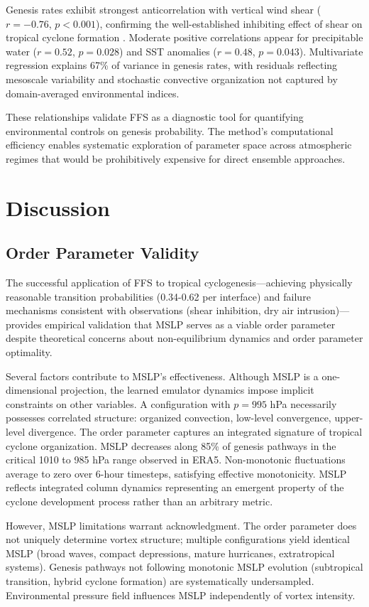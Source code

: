\documentclass[11pt]{article}
\begin{document}
Genesis rates exhibit strongest anticorrelation with vertical wind shear ($r = -0.76$, $p < 0.001$), confirming the well-established inhibiting effect of shear on tropical cyclone formation \citep{gray1968global}. Moderate positive correlations appear for precipitable water ($r = 0.52$, $p = 0.028$) and SST anomalies ($r = 0.48$, $p = 0.043$). Multivariate regression explains 67\% of variance in genesis rates, with residuals reflecting mesoscale variability and stochastic convective organization not captured by domain-averaged environmental indices.

These relationships validate FFS as a diagnostic tool for quantifying environmental controls on genesis probability. The method's computational efficiency enables systematic exploration of parameter space across atmospheric regimes that would be prohibitively expensive for direct ensemble approaches.
\section{Discussion}

\subsection{Order Parameter Validity}

The successful application of FFS to tropical cyclogenesis—achieving physically reasonable transition probabilities (0.34-0.62 per interface) and failure mechanisms consistent with observations (shear inhibition, dry air intrusion)—provides empirical validation that MSLP serves as a viable order parameter despite theoretical concerns about non-equilibrium dynamics and order parameter optimality.

Several factors contribute to MSLP's effectiveness. Although MSLP is a one-dimensional projection, the learned emulator dynamics impose implicit constraints on other variables. A configuration with $p = 995$ hPa necessarily possesses correlated structure: organized convection, low-level convergence, upper-level divergence. The order parameter captures an integrated signature of tropical cyclone organization. MSLP decreases along 85\% of genesis pathways in the critical 1010 to 985 hPa range observed in ERA5. Non-monotonic fluctuations average to zero over 6-hour timesteps, satisfying effective monotonicity. MSLP reflects integrated column dynamics representing an emergent property of the cyclone development process rather than an arbitrary metric.

However, MSLP limitations warrant acknowledgment. The order parameter does not uniquely determine vortex structure; multiple configurations yield identical MSLP (broad waves, compact depressions, mature hurricanes, extratropical systems). Genesis pathways not following monotonic MSLP evolution (subtropical transition, hybrid cyclone formation) are systematically undersampled. Environmental pressure field influences MSLP independently of vortex intensity.
\end{document}
